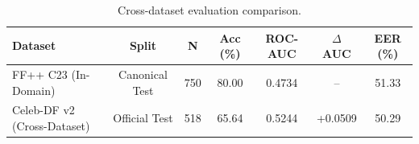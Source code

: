 \begin{table}[ht]
\centering\small
\begin{tabular}{lcccccc}
\toprule
Dataset & Split & N & Acc (\%) & ROC-AUC & $\Delta$ AUC & EER (\%) \\
\midrule
FF++ C23 (In-Domain) & Canonical Test & 750 & 80.00 & 0.4734 & -- & 51.33 \\
Celeb-DF v2 (Cross-Dataset) & Official Test & 518 & 65.64 & 0.5244 & +0.0509 & 50.29 \\
\bottomrule
\end{tabular}
\caption{Cross-dataset evaluation comparison.}
\label{tab:cross_dataset_results}
\end{table}
